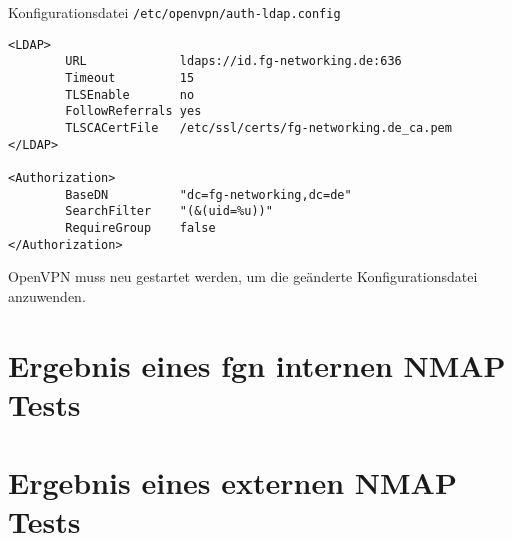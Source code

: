 \documentclass[11pt,a4paper,titlepage=firstiscover,headsepline]{scrartcl} %
\begin{document}
Konfigurationsdatei \texttt{/etc/openvpn/auth-ldap.config}
\begin{lstlisting}
<LDAP>
        URL             ldaps://id.fg-networking.de:636
        Timeout         15
        TLSEnable       no
        FollowReferrals yes
        TLSCACertFile   /etc/ssl/certs/fg-networking.de_ca.pem
</LDAP>

<Authorization>
        BaseDN          "dc=fg-networking,dc=de"
        SearchFilter    "(&(uid=%u))"
        RequireGroup    false
</Authorization>
\end{lstlisting}
OpenVPN muss neu gestartet werden, um die geänderte Konfigurationsdatei anzuwenden.

\newpage
\section{Ergebnis eines fgn internen NMAP Tests}\label{sec:NMAP-Test-int}
\newpage
\section{Ergebnis eines externen NMAP Tests}\label{sec:NMAP-Test-ext}

%
%
\end{document}
